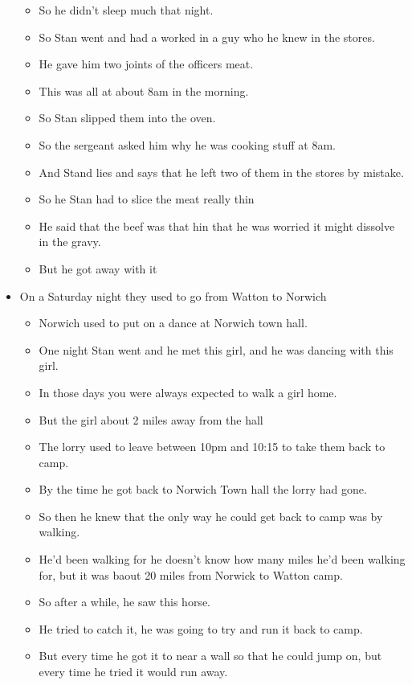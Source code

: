 \documentclass[10pt,twocolumn,letterpaper]{article}
\begin{document}
\begin{itemize}
\begin{itemize}
        \item So he didn't sleep much that night.
        \item So Stan went and had a worked in a guy who he knew in the stores. 
        \item He gave him two joints of the officers meat.
        \item This was all at about 8am in the morning.
        \item So Stan slipped them into the oven.
        \item So the sergeant asked him why he was cooking stuff at 8am. 
        \item And Stand lies and says that he left two of them in the stores by mistake.
        \item So he Stan had to slice the meat really thin
        \item He said that the beef was that hin that he was worried it might dissolve in the gravy.
        \item But he got away with it
    \end{itemize}
    \item On a Saturday night they used to go from Watton to Norwich
    \begin{itemize}
        \item Norwich used to put on a dance at Norwich town hall.
        \item One night Stan went and he met this girl, and he was dancing with this girl.
        \item In those days you were always expected to walk a girl home.
        \item But the girl about 2 miles away from the hall
        \item The lorry used to leave between 10pm and 10:15 to take them back to camp.
        \item By the time he got back to Norwich Town hall the lorry had gone.
        \item So then he knew that the only way he could get back to camp was by walking.
        \item He'd been walking for he doesn't know how many miles he'd been walking for, but it was baout 20 miles from Norwick to Watton camp.
        \item So after a while, he saw this horse.
        \item He tried to catch it, he was going to try and run it back to camp.
        \item But every time he got it to near a wall so that he could jump on, but every time he tried it would run away.

\end{itemize}
\end{itemize}
\end{document}

